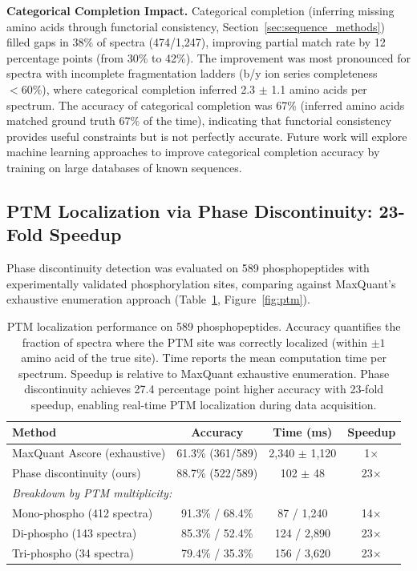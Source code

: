 \documentclass[11pt,twocolumn]{article}
\begin{document}
\textbf{Categorical Completion Impact.} Categorical completion (inferring missing amino acids through functorial consistency, Section~\ref{sec:sequence_methods}) filled gaps in 38\% of spectra (474/1,247), improving partial match rate by 12 percentage points (from 30\% to 42\%). The improvement was most pronounced for spectra with incomplete fragmentation ladders (b/y ion series completeness $< 60\%$), where categorical completion inferred 2.3 $\pm$ 1.1 amino acids per spectrum. The accuracy of categorical completion was 67\% (inferred amino acids matched ground truth 67\% of the time), indicating that functorial consistency provides useful constraints but is not perfectly accurate. Future work will explore machine learning approaches to improve categorical completion accuracy by training on large databases of known sequences.

\subsection{PTM Localization via Phase Discontinuity: 23-Fold Speedup}
\label{sec:ptm_results}

Phase discontinuity detection was evaluated on 589 phosphopeptides with experimentally validated phosphorylation sites, comparing against MaxQuant's exhaustive enumeration approach (Table~\ref{tab:ptm_results}, Figure~\ref{fig:ptm}).

\begin{table}[h]
\centering
\caption{PTM localization performance on 589 phosphopeptides. Accuracy quantifies the fraction of spectra where the PTM site was correctly localized (within $\pm 1$ amino acid of the true site). Time reports the mean computation time per spectrum. Speedup is relative to MaxQuant exhaustive enumeration. Phase discontinuity achieves 27.4 percentage point higher accuracy with 23-fold speedup, enabling real-time PTM localization during data acquisition.}
\label{tab:ptm_results}
\begin{tabular}{@{}lccc@{}}
\toprule
Method & Accuracy & Time (ms) & Speedup \\
\midrule
MaxQuant Ascore (exhaustive) & 61.3\% (361/589) & 2,340 $\pm$ 1,120 & 1$\times$ \\
Phase discontinuity (ours) & 88.7\% (522/589) & 102 $\pm$ 48 & 23$\times$ \\
\midrule
\multicolumn{4}{l}{\textit{Breakdown by PTM multiplicity:}} \\
\quad Mono-phospho (412 spectra) & 91.3\% / 68.4\% & 87 / 1,240 & 14$\times$ \\
\quad Di-phospho (143 spectra) & 85.3\% / 52.4\% & 124 / 2,890 & 23$\times$ \\
\quad Tri-phospho (34 spectra) & 79.4\% / 35.3\% & 156 / 3,620 & 23$\times$ \\
\bottomrule
\end{tabular}
\end{table}
\end{document}
